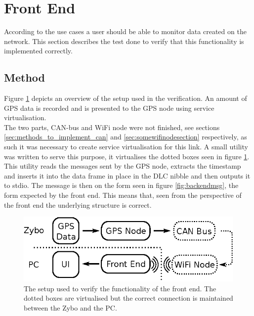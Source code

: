 
\section{Front End}
According to the use cases a user should be able to monitor data created on the network.
This section describes the test done to verify that this functionality is implemented correctly.
\subsection{Method}
Figure \ref{fig:frontendsetup} depicts an overview of the setup used in the verification.
An amount of GPS data is recorded and is presented to the GPS node using service virtualisation.\\

The two parts, CAN-bus and WiFi node were not finished, see sections \ref{sec:methods_to_implement_can} and \ref{sec:somewifinodesection} respectively, as such it was necessary to create service virtualisation for this link.
A small utility was written to serve this purpose, it virtualises the dotted boxes seen in figure \ref{fig:frontendsetup}.
This utility reads the messages sent by the GPS node, extracts the timestamp and inserts it into the data frame in place in the DLC nibble and then outputs it to stdio.
The message is then on the form seen in figure \ref{fig:backendmsg}, the form expected by the front end.
This means that, seen from the perspective of the front end the underlying structure is correct.

\begin{figure}
	\centering
	\includegraphics[width=.75\linewidth]{graphics/frontend_verification}
	\caption{The setup used to verify the functionality of the front end. 
	The dotted boxes are virtualised but the correct connection is maintained between the Zybo and the PC.}
	\label{fig:frontendsetup}
\end{figure}

